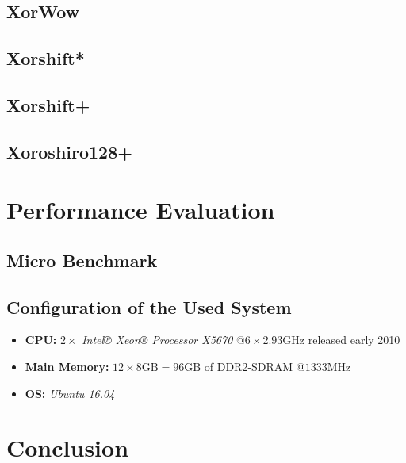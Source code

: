 \subsection[XorWow]{XorWow} \label{subsec:xorwow}

    

\subsection[Xorshift*]{Xorshift*} \label{subsec:xorshift*}

    

\subsection[Xorshift+]{Xorshift+} \label{subsec:xorshift+}

    

\subsection[Xoroshiro128+]{Xoroshiro128+} \label{subsec:xoroshiro128+}

    

\section[Performance Evaluation]{Performance Evaluation} \label{sec:random-performance}

\subsection[Micro Benchmark]{Micro Benchmark}

    

\subsection[System Configuration]{Configuration of the Used System}

\begin{@empty}
    \begin{itemize}
        \itemsep0em
        \item    \textbf{CPU:} $2 \times $ \emph{Intel® Xeon® Processor X5670} @$6 \times 2.93\text{GHz}$ released early 2010
        \item    \textbf{Main Memory:} $12 \times 8\text{GB} = 96\text{GB}$ of DDR2-SDRAM @$1333\text{MHz}$
        \item    \textbf{OS:} \emph{Ubuntu 16.04}
    \end{itemize}
\end{@empty}

\section{Conclusion}
